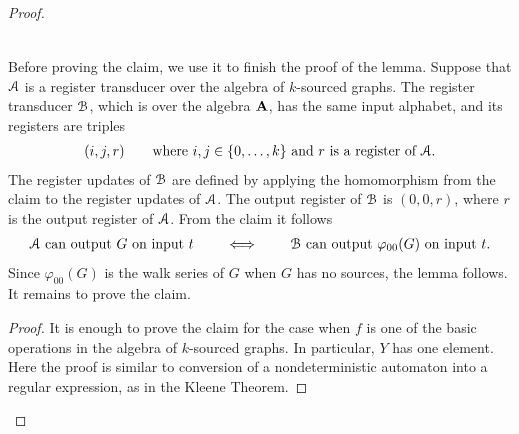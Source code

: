 \begin{proof}
\begin{claim}
\begin{align*}
            \end{align*}
        \end{claim}
        Before proving the claim, we use it to finish the proof of the lemma. Suppose that ${{\mathcal A}}$ is a register transducer over the algebra of $k$-sourced graphs. The register transducer  ${\mathcal B}$, which is over the algebra $\mathbf{A}$, has the same input alphabet, and its registers are triples 
        \begin{align*}
        (i,j,r) \qquad \text{where $i,j \in \{0,\ldots,k\}$ and $r$ is a register of ${{\mathcal A}}$.}
        \end{align*}
         The register updates of ${\mathcal B}$ are defined by applying the homomorphism from the claim  to the register updates of ${{\mathcal A}}$. 
        The output register of ${\mathcal B}$ is $(0,0,r)$, where  $r$ is the output register of ${{\mathcal A}}$.  From the claim it follows 
        \begin{align*}
        \text{${{\mathcal A}}$ can output $G$ on input $t$} \qquad \iff \qquad 
        \text{${\mathcal B}$ can output $\varphi_{00}(G)$ on input $t$}.
        \end{align*}
        Since $\varphi_{00}(G)$ is the walk series of $G$ when $G$ has no sources, the lemma follows. It remains to prove the claim.

        \begin{proof} 
            It is enough to prove the claim for the case when $f$ is one of the basic operations in the algebra of $k$-sourced graphs. In particular, $Y$ has one element. Here the proof is similar to conversion of a nondeterministic automaton into a regular expression, as in the Kleene Theorem.
            

\end{proof}
\end{proof}
